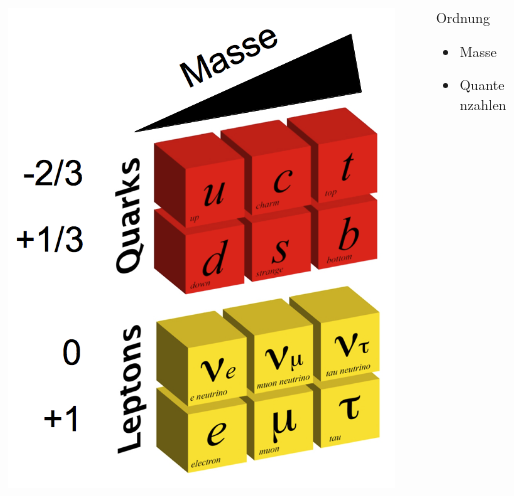 \documentclass{beamer}
\begin{document}
\begin{frame}
\begin{columns}[T]
\begin{column}{0.5\textwidth}
\begin{center}
{          \includegraphics[width=0.95\textwidth]{sm/SM-Table_Antimatter.png}\\
        }
      \end{center}
      \vskip-3cm
    \end{column}
    \begin{column}{0.5\textwidth}
      \begin{block}{Ordnung}
        \begin{itemize}
        \item Masse
        \item Quantenzahlen

\end{itemize}
\end{block}
\end{column}
\end{columns}
\end{frame}
\end{document}

